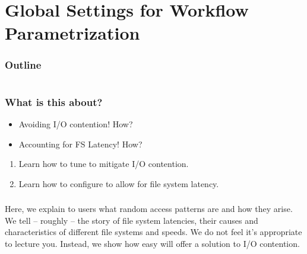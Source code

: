 \section{Global Settings for Workflow Parametrization}

\begin{frame}
    \frametitle{Outline}
    \begin{columns}[t]
        \begin{column}{.5\textwidth}
            \tableofcontents[sections={1-7},currentsection]
        \end{column}
        \begin{column}{.5\textwidth}
            \tableofcontents[sections={8-15},currentsection]
        \end{column}
    \end{columns}
\end{frame}

\begin{frame}
  \frametitle{What is this about?}
  \begin{question}[Questions]
   	\begin{itemize}
      \item Avoiding I/O contention! How?
      \item Accounting for FS Latency! How?
    \end{itemize}
  \end{question}
   \begin{docs}[Objectives]
   	 \begin{enumerate} 
        \item Learn how to tune \Snakemake{} to mitigate I/O contention.
        \item Learn how to configure \Snakemake{} to allow for file system latency.
    \end{enumerate}
  \end{docs}
\end{frame}

\begin{frame}
	\frametitle{}
	\begin{hint}
		Here, we explain to users what random access patterns are and how they arise.\newline
		We tell -- roughly -- the story of file system latencies, their causes and characteristics of different file systems and speeds.\newline
		\pause
		We do not feel it's appropriate to lecture you. Instead, we show how easy \Snakemake will offer a solution to I/O contention.
	\end{hint}
\end{frame}

